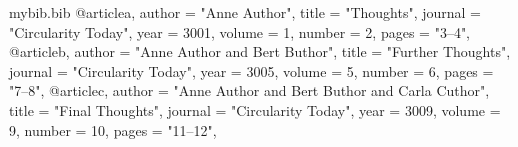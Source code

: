 \RequirePackage{filecontents}
\begin{filecontents}{mybib.bib}
@article{a,
  author  = "Anne Author",
  title   = "Thoughts",
  journal = "Circularity Today",
  year    = 3001,
  volume  = 1,
  number  = 2,
  pages   = "3--4",
}
@article{b,
  author  = "Anne Author and Bert Buthor",
  title   = "Further Thoughts",
  journal = "Circularity Today",
  year    = 3005,
  volume  = 5,
  number  = 6,
  pages   = "7--8",
}
@article{c,
  author  = "Anne Author and Bert Buthor and Carla Cuthor",
  title   = "Final Thoughts",
  journal = "Circularity Today",
  year    = 3009,
  volume  = 9,
  number  = 10,
  pages   = "11--12",
}
\end{filecontents}

\documentclass{article}
\usepackage[a4paper,margin=2.5cm]{geometry}
\usepackage[ngerman]{babel}

\usepackage[T1]{fontenc}
\usepackage[utf8]{inputenc}
\usepackage{lmodern}

\usepackage[natbibapa]{apacite}



\citet{a}, \citet{b}, \citet{c}

\citep{a}, \citep{b}, \citep{c}


 
